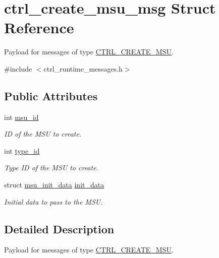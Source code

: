 \hypertarget{structctrl__create__msu__msg}{\section{ctrl\-\_\-create\-\_\-msu\-\_\-msg Struct Reference}
\label{structctrl__create__msu__msg}
}


Payload for messages of type \hyperlink{ctrl__runtime__messages_8h_aff250b7918a6975b13277c84bc6ec5b9a63b47c3674f449f7bb6842ff88c04d5e}{C\-T\-R\-L\-\_\-\-C\-R\-E\-A\-T\-E\-\_\-\-M\-S\-U}.  




{\ttfamily \#include $<$ctrl\-\_\-runtime\-\_\-messages.\-h$>$}

\subsection*{Public Attributes}
\begin{DoxyCompactItemize}
\item 
int \hyperlink{structctrl__create__msu__msg_aec871367234b4ccbd2e60c0e15bc25f3}{msu\-\_\-id}
\begin{DoxyCompactList}\small\item\em I\-D of the M\-S\-U to create. \end{DoxyCompactList}\item 
int \hyperlink{structctrl__create__msu__msg_a18fff65123f61b0f764841d1e9363dcf}{type\-\_\-id}
\begin{DoxyCompactList}\small\item\em Type I\-D of the M\-S\-U to create. \end{DoxyCompactList}\item 
struct \hyperlink{structmsu__init__data}{msu\-\_\-init\-\_\-data} \hyperlink{structctrl__create__msu__msg_acb66d3835b590481831542308c79cc93}{init\-\_\-data}
\begin{DoxyCompactList}\small\item\em Initial data to pass to the M\-S\-U. \end{DoxyCompactList}\end{DoxyCompactItemize}


\subsection{Detailed Description}
Payload for messages of type \hyperlink{ctrl__runtime__messages_8h_aff250b7918a6975b13277c84bc6ec5b9a63b47c3674f449f7bb6842ff88c04d5e}{C\-T\-R\-L\-\_\-\-C\-R\-E\-A\-T\-E\-\_\-\-M\-S\-U}. 

